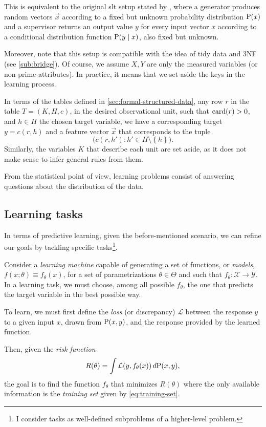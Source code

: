 This is equivalent to the original \gls{slt} setup stated by \textcite{Vapnik1999b}, where
a generator produces random vectors $\vec{x}$ according to a fixed but unknown
probability distribution $\Prob(x)$ and a supervisor returns an output value $y$ for every
input vector $x$ according to a conditional distribution function $\Prob(y \mid x)$, also fixed but
unknown.

Moreover, note that this setup is compatible with the idea of tidy data and 3NF (see
\cref{sub:bridge}). Of course, we assume $X, Y$ are only the measured variables (or
non-prime attributes).  In practice, it means that we set aside the keys in the learning
process.

In terms of the tables defined in \cref{sec:formal-structured-data}, any row $r$ in the
table $T = (K, H, c)$, in the desired observational unit, such that $\rowcard[r] > 0$, and
$h \in H$ the chosen target variable, we have a corresponding target $y = c(r, h)$ and a
feature vector $\vec{x}$ that corresponds to the tuple $$\big(c(r, h') : h' \in H \setminus
\left\{ h \right\}\big)\text{.}$$  Similarly, the variables $K$ that describe each unit
are set aside, as it does not make sense to infer general rules from them.

From the statistical point of view, learning problems consist of answering questions about
the distribution of the data.

\subsection{Learning tasks}

In terms of predictive learning, given the before-mentioned scenario, we can refine our
goals by tackling specific tasks\footnote{I consider tasks as well-defined subproblems of
a higher-level problem.}.

Consider a \emph{learning machine} capable of generating a set of functions, or
\emph{models}, $f(x; \theta) \equiv f_\theta(x)$, for a set of parametrizations $\theta
\in \Theta$ and such that $f_\theta : \mathcal{X} \rightarrow \mathcal{Y}$.  In a learning
task, we must choose, among all possible $f_\theta$, the one that predicts the target
variable in the best possible way.

To learn, we must first define the \emph{loss} (or discrepancy) $\mathcal{L}$
between the response $y$ to a given input $x$, drawn from $\Prob(x, y)$, and the
response provided by the learned function.

Then, given the \emph{risk function}
\begin{equation}
  \label{eq:risk}
  R(\theta) = \int \mathcal{L}(y, f_\theta(x))\, d\!\Prob(x, y)\text{,}
\end{equation}
the goal is to find the function $f_\theta$ that minimizes $R(\theta)$
where the only available information is the \emph{training set} given by \eqref{eq:training-set}.

